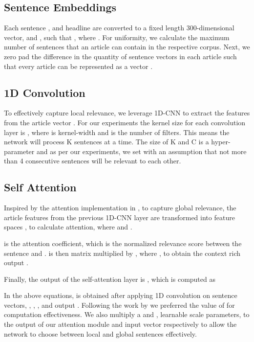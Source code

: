 \documentclass[11pt,a4paper]{article}
\begin{document}
\subsection{Sentence Embeddings}
Each sentence , and headline  are converted to a fixed length 300-dimensional vector,  and , such that , where . For uniformity, we calculate the maximum number of sentences  that an article can contain in the respective corpus. Next, we zero pad the difference in the quantity of sentence vectors in each article such that every article can be represented as a vector .


\subsection{1D Convolution}
To effectively capture local relevance, we leverage 1D-CNN \cite{lecun1998gradient} to extract the features from the article vector . For our experiments the kernel size for each convolution layer is , where  is kernel-width and  is the number of filters. This means the network will process K sentences at a time. The size of K and C is a hyper-parameter and as per our experiments, we set  with an assumption that not more than 4 consecutive sentences will be relevant to each other.

\subsection{Self Attention}
\label{subsection:self_attention}
Inspired by the attention implementation in \cite{zhang2018selfattention, vaswani_attention_2017}, to capture global relevance, the article features from the previous 1D-CNN layer are transformed into feature spaces ,  to calculate attention, where  and . 



 is the attention coefficient, which is the normalized relevance score between the sentence  and .  is then matrix multiplied by , where , to obtain the context rich output . 

Finally, the output of the self-attention layer is , which is computed as

In the above equations,  is obtained after applying 1D convolution on sentence vectors, , , ,  and output . Following the work by \cite{zhang2018selfattention} we preferred the value of  for computation effectiveness. 
We also multiply a  and , learnable scale parameters, to the output of our attention module and input vector respectively to allow the network to choose between local and global sentences effectively.
\end{document}
